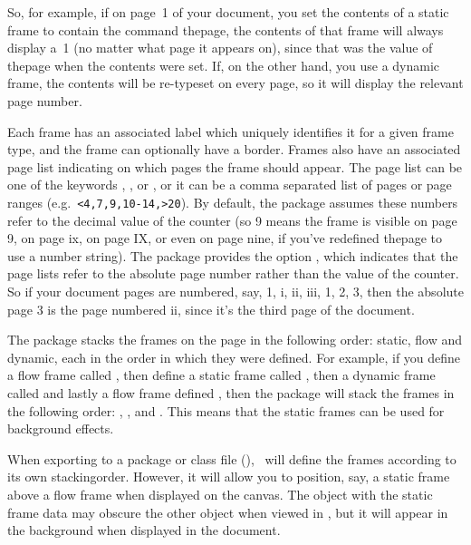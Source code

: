 So, for example, if on page~1 of your document, you set the contents
of a static frame to contain the command \gls{thepage}, the
contents of that frame will always display a~1 (no matter what page
it appears on), since that was the value of \gls{thepage} when
the contents were set. If, on the other hand, you use a dynamic
frame, the contents will be re-typeset on every page, so it will
display the relevant page number.

Each frame has an associated label which uniquely identifies it for
a given frame type, and the frame can optionally have a border. Frames also
have an associated page list indicating on which pages the frame
should appear.  The page list can be one of the keywords
, ,  or , or it
can be a comma separated list of pages or page ranges (e.g.\
\verb|<4,7,9,10-14,>20|). By default, the  package
assumes these numbers refer to the decimal value of the
 counter (so 9 means the frame is visible on page 9, on
page ix, on page IX, or even on page nine, if you've redefined
\gls{thepage} to use a number string). The 
package provides the option , which indicates
that the page lists refer to the absolute page number rather than
the value of the \ctr{page} counter. So if your document pages
are numbered, say, 1, i, ii, iii, 1, 2, 3, then the absolute page 3
is the page numbered ii, since it's the third page of the document.

The  package stacks the frames on the page in
the following order: static, flow and dynamic, each in the order
in which they were defined. For example, if you define a flow frame
called \optfmt{left}, then define a static frame called
, then a dynamic frame called 
and lastly a flow frame defined , then the
 package will stack the frames in the following
order: , ,  and
. This means that the static frames can be used for
background effects.

When exporting to a package or class file (),
\FlowframTk\ will define the frames according to its own
\gls{stackingorder}. However, it will allow you to position, say, a
static frame above a flow frame when displayed on the \gls{canvas}.
The object with the static frame data may obscure the other object
when viewed in \FlowframTk, but it will appear in the background
when displayed in the document.


